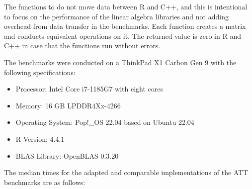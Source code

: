 \documentclass[12pt]{article}
\providecommand{\tightlist}{\setlength{\itemsep}{0pt}\setlength{\parskip}{0pt}}
\begin{document}
The functions to do not move data between R and C++, and this is
intentional to focus on the performance of the linear algebra libraries
and not adding overhead from data transfer in the benchmarks. Each
function creates a matrix and conducts equivalent operations on it. The
returned value is zero in R and C++ in case that the functions run
without errors.

The benchmarks were conducted on a ThinkPad X1 Carbon Gen 9 with the
following specifications:

\begin{itemize}
\tightlist
\item
  Processor: Intel Core i7-1185G7 with eight cores
\item
  Memory: 16 GB LPDDR4Xx-4266
\item
  Operating System: Pop!\_OS 22.04 based on Ubuntu 22.04
\item
  R Version: 4.4.1
\item
  BLAS Library: OpenBLAS 0.3.20
\end{itemize}

The median times for the adapted and comparable implementations of the
ATT benchmarks are as follows:
\end{document}
